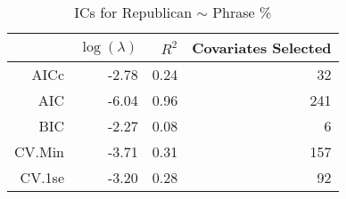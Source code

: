 \begin{table}[ht]
\centering
\begin{tabular}{rrrr}
  \hline
 & $\log(\lambda)$ & $R^2$ & Covariates Selected \\ 
  \hline
AICc & -2.78 & 0.24 &  32 \\ 
  AIC & -6.04 & 0.96 & 241 \\ 
  BIC & -2.27 & 0.08 &   6 \\ 
  CV.Min & -3.71 & 0.31 & 157 \\ 
  CV.1se & -3.20 & 0.28 &  92 \\ 
   \hline
\end{tabular}
\caption{ICs for Republican $\sim$ Phrase \%} 
\label{tab:repx}
\end{table}
